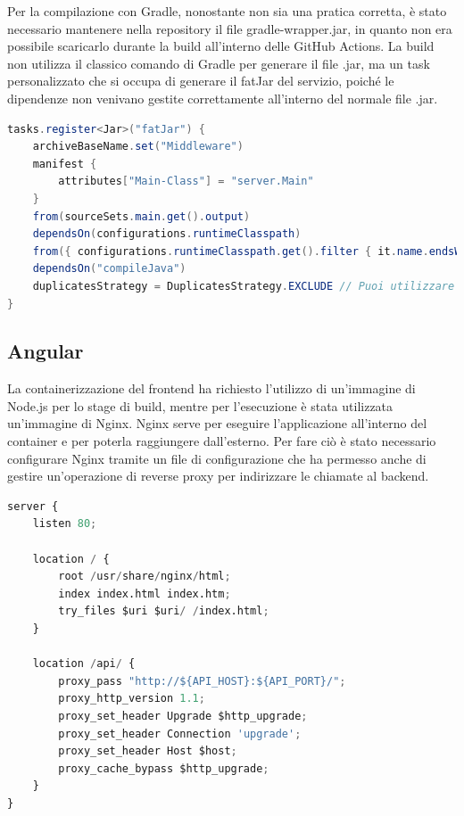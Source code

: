 Per la compilazione con Gradle, nonostante non sia una pratica corretta, è stato necessario mantenere nella repository il file gradle-wrapper.jar, in quanto non era possibile scaricarlo durante la build all'interno delle GitHub Actions.
La build non utilizza il classico comando di Gradle per generare il file .jar, ma un task personalizzato che si occupa di generare il fatJar del servizio, poiché le dipendenze non venivano gestite correttamente all'interno del normale file .jar.

\begin{lstlisting}[language=Java, caption={Task del fatJar da includere nel container}, label=list:gradle_fatJar]
tasks.register<Jar>("fatJar") {
    archiveBaseName.set("Middleware")
    manifest {
        attributes["Main-Class"] = "server.Main"
    }
    from(sourceSets.main.get().output)
    dependsOn(configurations.runtimeClasspath)
    from({ configurations.runtimeClasspath.get().filter { it.name.endsWith("jar") }.map { zipTree(it) } })
    dependsOn("compileJava")
    duplicatesStrategy = DuplicatesStrategy.EXCLUDE // Puoi utilizzare altre strategie come DuplicatesStrategy.WARN per avvisare ma non fermare la build
}
\end{lstlisting}

\subsection{Angular}

La containerizzazione del frontend ha richiesto l'utilizzo di un'immagine di Node.js per lo stage di build, mentre per l'esecuzione è stata utilizzata un'immagine di Nginx.
Nginx serve per eseguire l'applicazione all'interno del container e per poterla raggiungere dall'esterno. Per fare ciò è stato necessario configurare Nginx tramite un file di configurazione che ha permesso anche di gestire un'operazione di reverse proxy per indirizzare le chiamate al backend.

\begin{lstlisting}[language=Python, caption={Configurazione Nginx del front-end}, label=list:nginx_frontend]
server {
    listen 80;
    
    location / {
        root /usr/share/nginx/html;
        index index.html index.htm;
        try_files $uri $uri/ /index.html;
    }

    location /api/ {
        proxy_pass "http://${API_HOST}:${API_PORT}/";
        proxy_http_version 1.1;
        proxy_set_header Upgrade $http_upgrade;
        proxy_set_header Connection 'upgrade';
        proxy_set_header Host $host;
        proxy_cache_bypass $http_upgrade;
    }
}
\end{lstlisting}

